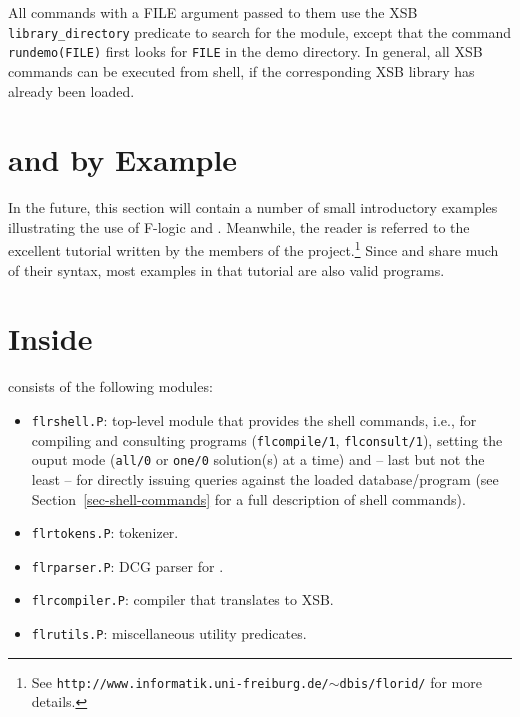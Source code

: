 \documentclass[11pt]{report}
\begin{document}
\addtocounter{footnote}{-3}
\addtocounter{footnote}{1}
\addtocounter{footnote}{1}
\addtocounter{footnote}{1}

All commands with a FILE argument passed to them use the XSB {\tt library\_directory}
predicate to search for the module, except that the command {\tt rundemo(FILE)}
first looks for {\tt FILE} in the \FLORA demo directory. In general, all XSB commands
can be executed from \FLORA shell, if the corresponding XSB library has already been
loaded.


\section{\fl and \FLORA by Example}

In the future, this section will contain a number of small
introductory examples illustrating the use of F-logic and \FLORA. Meanwhile, the
reader is referred to the excellent tutorial written by the members of the
\FLORID project.\footnote{
  See {\tt http://www.informatik.uni-freiburg.de/$\sim$dbis/florid/} for more
  details.
  }
Since \FLORA and \FLORID share much of their syntax, most examples in that
tutorial are also valid \FLORA programs.



\section{Inside \FLORA}


\FLORA consists of the following modules:
\begin{itemize}
\item \texttt{flrshell.P}: top-level module that provides the \FLORA shell
  commands, i.e., for compiling and consulting \FLORA programs
  (\texttt{flcompile/1}, \texttt{flconsult/1}), setting the ouput mode
  (\texttt{all/0} or \texttt{one/0} solution(s) at a time) and -- last
  but not the least -- for directly issuing queries against the loaded
  database/program (see Section~\ref{sec-shell-commands} for a full description
  of shell commands).
\item \texttt{flrtokens.P}: \FLORA tokenizer.
\item \texttt{flrparser.P}: DCG parser for \fl.
\item \texttt{flrcompiler.P}: \FLORA compiler that translates \fl to XSB.
\item \texttt{flrutils.P}: miscellaneous utility predicates.
\end{itemize}
\end{document}
